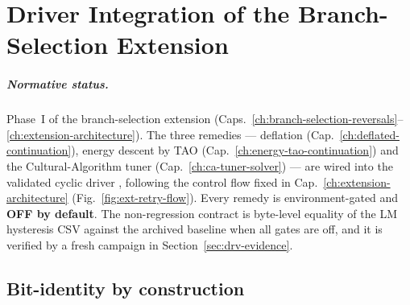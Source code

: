 
\chapter{Driver Integration of the Branch-Selection Extension}
\label{ch:driver-integration}

\paragraph{Normative status.}
Phase~I of the branch-selection extension
(Caps.~\ref{ch:branch-selection-reversals}--\ref{ch:extension-architecture}).
The three remedies --- deflation
(Cap.~\ref{ch:deflated-continuation}), energy descent by TAO
(Cap.~\ref{ch:energy-tao-continuation}) and the Cultural-Algorithm tuner
(Cap.~\ref{ch:ca-tuner-solver}) --- are wired into the validated cyclic
driver ,
following the control flow fixed in Cap.~\ref{ch:extension-architecture}
(Fig.~\ref{fig:ext-retry-flow}). Every remedy is environment-gated and
\textbf{OFF by default}. The non-regression contract is byte-level
equality of the LM hysteresis CSV against the archived baseline
 when all gates are off, and it is verified
by a fresh campaign in Section~\ref{sec:drv-evidence}.

\section{Bit-identity by construction}
\label{sec:drv-bitident}

